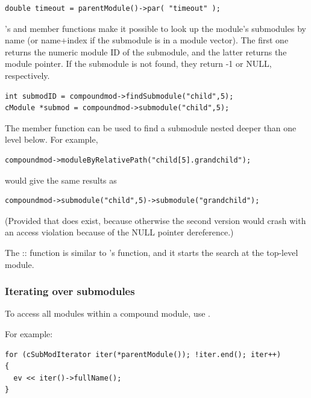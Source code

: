 \begin{verbatim}
double timeout = parentModule()->par( "timeout" );
\end{verbatim}


's  and 
member functions make it possible to look up the module's submodules
by name (or name+index if the submodule
is in a module vector). The first one returns the numeric module ID of
the submodule, and the latter returns the module pointer.  If the
submodule is not found, they return -1 or NULL, respectively.

\begin{verbatim}
int submodID = compoundmod->findSubmodule("child",5);
cModule *submod = compoundmod->submodule("child",5);
\end{verbatim}


The  member function can be used to find
a submodule nested deeper than one level below. For example,

\begin{verbatim}
compoundmod->moduleByRelativePath("child[5].grandchild");
\end{verbatim}

would give the same results as

\begin{verbatim}
compoundmod->submodule("child",5)->submodule("grandchild");
\end{verbatim}

(Provided that  does exist, because otherwise the second
version would crash with an access violation because of the NULL
pointer dereference.)


The :: function is similar
to 's  function, and it
starts the search at the top-level module.


\subsubsection{Iterating over submodules}


To access all modules within a compound module,
use .

For example:

\begin{verbatim}
for (cSubModIterator iter(*parentModule()); !iter.end(); iter++)
{
  ev << iter()->fullName();
}
\end{verbatim}

